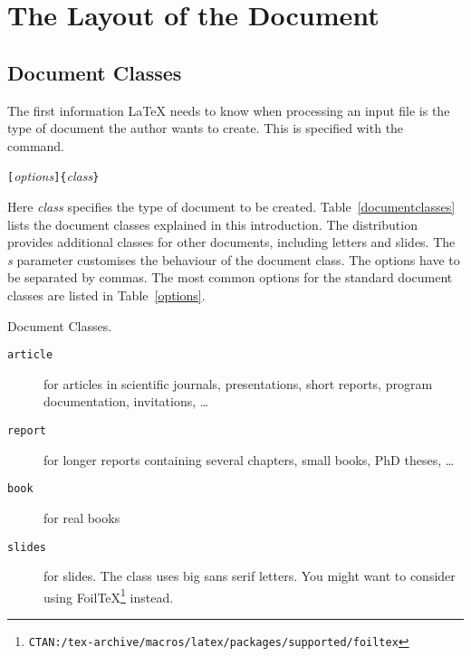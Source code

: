 \section{The Layout of the Document}
 
\subsection {Document Classes}\label{sec:documentclass}

The first information \LaTeX{} needs to know when processing an
input file is the type of document the author wants to create. This
is specified with the  command.
\begin{command}
\verb|[|\emph{options}\verb|]{|\emph{class}\verb|}|
\end{command}
\noindent Here \emph{class} specifies the type of document to be created.
Table~\ref{documentclasses} lists the document classes explained in
this introduction. The \LaTeXe{} distribution provides additional
classes for other documents, including letters and slides.  The
\emph{s} parameter customises the behaviour of the document
class. The options have to be separated by commas. The most common options for the standard document
classes are listed in
Table~\ref{options}.


\begin{table}[!bp]
\caption{Document Classes.} \label{documentclasses}
\begin{lined}{12cm}
\begin{description}
 
\item [\normalfont\texttt{article}] for articles in scientific journals, presentations,
  short reports, program documentation, invitations, \ldots
\item [\normalfont\texttt{report}] for longer reports containing several chapters, small
  books, PhD theses, \ldots {}
\item [\normalfont\texttt{book}] for real books 
\item [\normalfont\texttt{slides}] for slides. The class uses big sans serif
  letters. You might want to consider using Foil\TeX{}\footnote{%
        \texttt{CTAN:/tex-archive/macros/latex/packages/supported/foiltex}} instead.
\end{description}
\end{lined}
\end{table}

